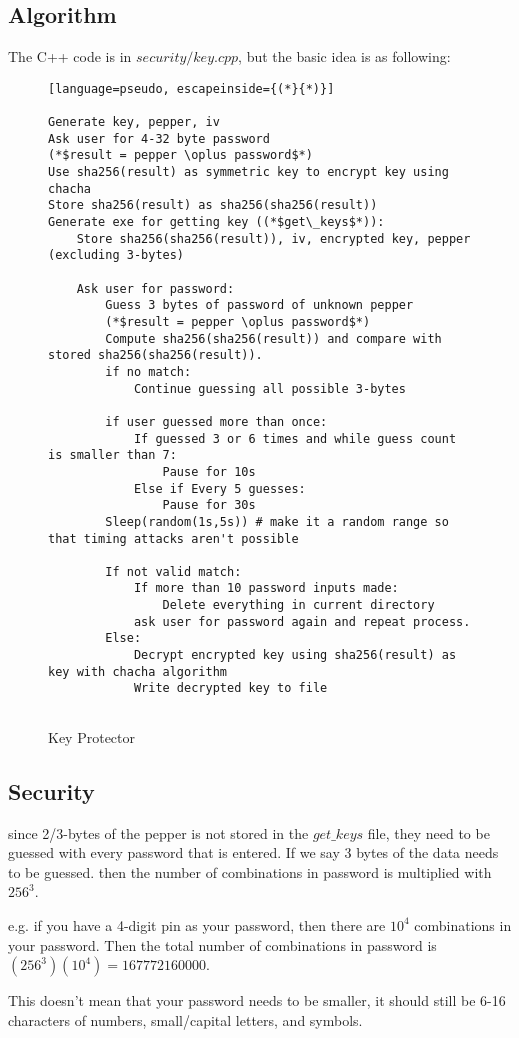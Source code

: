 \documentclass[a4paper,12pt]{article}
\begin{document}
\subsection{Algorithm}
The C++ code is in $security/key.cpp$, but the basic idea is as following:

\begin{figure}[htb]
\begin{small}
\begin{lstlisting}[language=pseudo, escapeinside={(*}{*)}]

Generate key, pepper, iv
Ask user for 4-32 byte password
(*$result = pepper \oplus password$*)
Use sha256(result) as symmetric key to encrypt key using chacha
Store sha256(result) as sha256(sha256(result))
Generate exe for getting key ((*$get\_keys$*)):
	Store sha256(sha256(result)), iv, encrypted key, pepper (excluding 3-bytes)

	Ask user for password:
		Guess 3 bytes of password of unknown pepper
		(*$result = pepper \oplus password$*)
		Compute sha256(sha256(result)) and compare with stored sha256(sha256(result)).
		if no match:
			Continue guessing all possible 3-bytes

		if user guessed more than once:
			If guessed 3 or 6 times and while guess count is smaller than 7:
				Pause for 10s
			Else if Every 5 guesses:
				Pause for 30s
		Sleep(random(1s,5s)) # make it a random range so that timing attacks aren't possible

		If not valid match:
			If more than 10 password inputs made:
				Delete everything in current directory
			ask user for password again and repeat process.
		Else:
			Decrypt encrypted key using sha256(result) as key with chacha algorithm
			Write decrypted key to file
			

\end{lstlisting}
\end{small}
\caption{Key Protector}\label{key_protector}
\end{figure}


\subsection{Security}

since 2/3-bytes of the pepper is not stored in the $get\_keys$ file, they need to be guessed with every password that is entered. If we say 3 bytes of the data needs to be guessed. then the number of combinations in password is multiplied with $256^3$.

e.g. if you have a 4-digit pin as your password, then there are $10^4$ combinations in your password. Then the total number of combinations in password is $(256^3)(10^4) = 167772160000$.

This doesn't mean that your password needs to be smaller, it should still be 6-16 characters of numbers, small/capital letters, and symbols.
\end{document}
